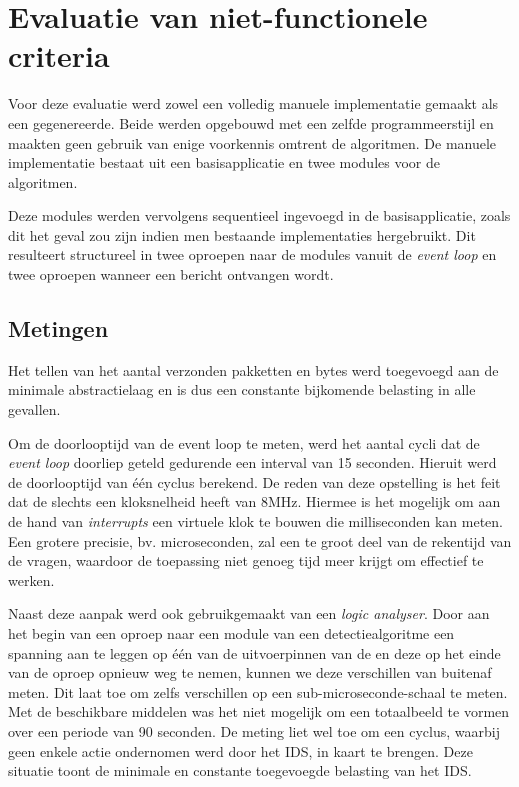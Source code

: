 \vspace{-3mm}

\section{Evaluatie van niet-functionele criteria}
\label{section:evaluation-non-functionals}

Voor deze evaluatie werd zowel een volledig manuele implementatie gemaakt als
een gegenereerde. Beide werden opgebouwd met een zelfde programmeerstijl en
maakten geen gebruik van enige voorkennis omtrent de algoritmen. De manuele
implementatie bestaat uit een basisapplicatie en twee modules voor de
algoritmen.

Deze modules werden vervolgens sequentieel ingevoegd in de basisapplicatie,
zoals dit het geval zou zijn indien men bestaande implementaties hergebruikt.
Dit resulteert structureel in twee oproepen naar de modules vanuit de
\emph{event loop} en twee oproepen wanneer een bericht ontvangen wordt.

\vspace{-3mm}

\subsection{Metingen}

Het tellen van het aantal verzonden pakketten en bytes werd toegevoegd aan de
minimale abstractielaag en is dus een constante bijkomende belasting in alle
gevallen.

Om de doorlooptijd van de event loop te meten, werd het aantal cycli dat de
\emph{event loop} doorliep geteld gedurende een interval van 15 seconden.
Hieruit werd de doorlooptijd van \'e\'en cyclus berekend. De reden van deze
opstelling is het feit dat de \mcu slechts een kloksnelheid heeft van 8MHz.
Hiermee is het mogelijk om aan de hand van \emph{interrupts} een virtuele klok
te bouwen die milliseconden kan meten. Een grotere precisie, bv. microseconden,
zal een te groot deel van de rekentijd van de \mcu vragen, waardoor de
toepassing niet genoeg tijd meer krijgt om effectief te werken.

Naast deze aanpak werd ook gebruikgemaakt van een \emph{logic analyser}. Door
aan het begin van een oproep naar een module van een detectiealgoritme een
spanning aan te leggen op \'e\'en van de uitvoerpinnen van de \mcu en deze op
het einde van de oproep opnieuw weg te nemen, kunnen we deze verschillen van
buitenaf meten. Dit laat toe om zelfs verschillen op een
sub-microseconde-schaal te meten. Met de beschikbare middelen was het niet
mogelijk om een totaalbeeld te vormen over een periode van 90 seconden. De
meting liet wel toe om een cyclus, waarbij geen enkele actie ondernomen werd
door het IDS, in kaart te brengen. Deze situatie toont de minimale en constante
toegevoegde belasting van het IDS.

